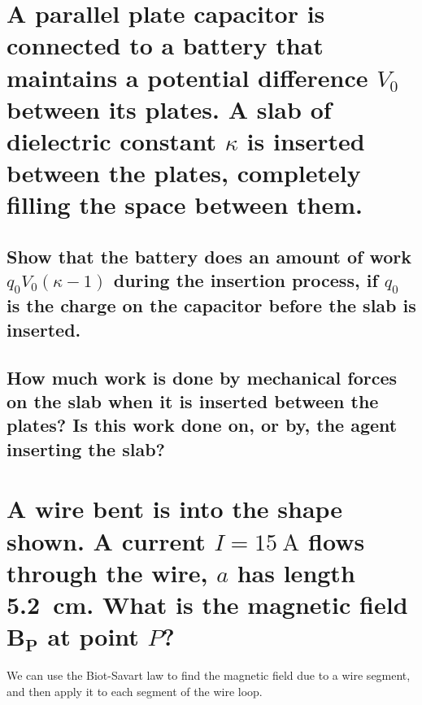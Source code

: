 \documentclass[a4paper]{scrartcl}
\begin{document}
\section{A parallel plate capacitor is connected to a battery that maintains a potential difference \(V_0\) between its plates. A slab of dielectric constant \(\kappa\) is inserted between the plates, completely filling the space between them.}
\subsection{Show that the battery does an amount of work \(q_0 V_0 (\kappa - 1)\) during the insertion process, if \(q_0\) is the charge on the capacitor before the slab is inserted.}

\subsection{How much work is done by mechanical forces on the slab when it is inserted between the plates? Is this work done on, or by, the agent inserting the slab?}

\section{A wire bent is into the shape shown. A current \(I = \SI{15}{\ampere}\) flows through the wire, \(a\) has length \SI{5.2}{\centi\metre}. What is the magnetic field \(\mathbf{B_P}\) at point \(P\)?}
\begin{center}
\end{center}
We can use the Biot-Savart law to find the magnetic field due to a wire segment, and then apply it to each segment of the wire loop.
\end{document}
